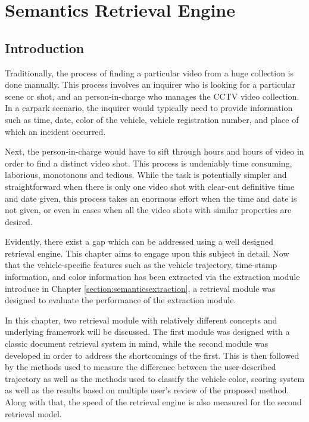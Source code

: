 \chapter{Semantics Retrieval Engine}
\label{section:retrievalengine}
\section{Introduction}

Traditionally, the process of finding a particular video from a huge collection is done manually. This process involves an inquirer who is looking for a particular scene or shot, and an person-in-charge who manages the CCTV video collection. In a carpark scenario, the inquirer would typically need to provide information such as time, date, color of the vehicle, vehicle registration number, and place of which an incident occurred. 

Next, the person-in-charge would have to sift through hours and hours of video in order to find a distinct video shot. This process is undeniably time consuming, laborious, monotonous and tedious. While the task is potentially simpler and straightforward when there is only one video shot with clear-cut definitive time and date given, this process takes an enormous effort when the time and date is not given, or even in cases when all the video shots with similar properties are desired. 

Evidently, there exist a gap which can be addressed using a well designed retrieval engine. This chapter aims to engage upon this subject in detail. Now that the vehicle-specific features such as the vehicle trajectory, time-stamp information, and color information has been extracted via the extraction module introduce in Chapter \ref{section:semanticsextraction}, a retrieval module was designed to evaluate the performance of the extraction module. 


In this chapter, two retrieval module with relatively different concepts and underlying framework will be discussed. The first module was designed with a classic document retrieval system in mind, while the second module was developed in order to address the shortcomings of the first. This is then followed by the methods used to measure the difference between the user-described trajectory as well as the methods used to classify the vehicle color, scoring system as well as the results based on multiple user's review of the proposed method. Along with that, the speed of the retrieval engine is also measured for the second retrieval model.

